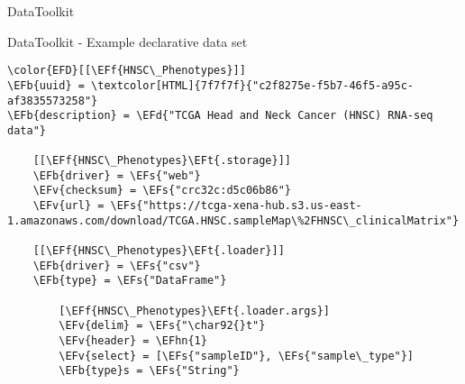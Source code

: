 \documentclass[bigger]{beamer}
\newcommand{\EFs}[1]{\textcolor{EFs}{#1}} %
\newcommand{\EFd}[1]{\textcolor{EFd}{\textit{#1}}} %
\newcommand{\EFb}[1]{\textcolor{EFb}{#1}} %
\newcommand{\EFf}[1]{\textcolor{EFf}{#1}} %
\newcommand{\EFv}[1]{\textcolor{EFv}{#1}} %
\newcommand{\EFt}[1]{\textcolor{EFt}{#1}} %
\newcommand{\EFhn}[1]{\textcolor{EFhn}{\textbf{#1}}} %
\begin{document}
\begin{frame}[label={sec:org102889b}]{DataToolkit}
\begin{center}

\end{center}
\end{frame}

\begin{frame}[label={sec:org9b78056},fragile]{DataToolkit - Example declarative data set}
 \small
\begin{Code}
\begin{Verbatim}
\color{EFD}[[\EFf{HNSC\_Phenotypes}]]
\EFb{uuid} = \textcolor[HTML]{7f7f7f}{"c2f8275e-f5b7-46f5-a95c-af3835573258"}
\EFb{description} = \EFd{"TCGA Head and Neck Cancer (HNSC) RNA-seq data"}

    [[\EFf{HNSC\_Phenotypes}\EFt{.storage}]]
    \EFb{driver} = \EFs{"web"}
    \EFv{checksum} = \EFs{"crc32c:d5c06b86"}
    \EFv{url} = \EFs{"https://tcga-xena-hub.s3.us-east-1.amazonaws.com/download/TCGA.HNSC.sampleMap\%2FHNSC\_clinicalMatrix"}

    [[\EFf{HNSC\_Phenotypes}\EFt{.loader}]]
    \EFb{driver} = \EFs{"csv"}
    \EFb{type} = \EFs{"DataFrame"}

        [\EFf{HNSC\_Phenotypes}\EFt{.loader.args}]
        \EFv{delim} = \EFs{"\char92{}t"}
        \EFv{header} = \EFhn{1}
        \EFv{select} = [\EFs{"sampleID"}, \EFs{"sample\_type"}]
        \EFb{type}s = \EFs{"String"}
\end{Verbatim}
\end{Code}
\end{frame}
\end{document}
